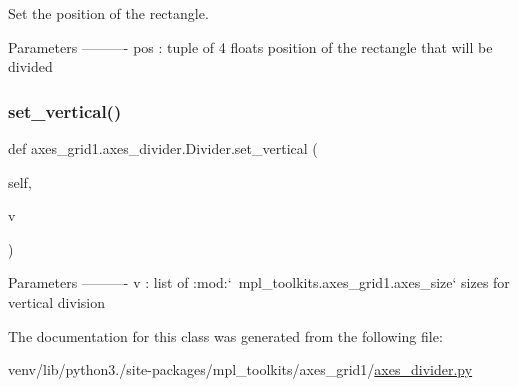 \begin{DoxyVerb}Set the position of the rectangle.

Parameters
----------
pos : tuple of 4 floats
    position of the rectangle that will be divided
\end{DoxyVerb}
 \mbox{\label{classaxes__grid1_1_1axes__divider_1_1Divider_a29de33914fc9161ce56c4b3942f3573f}} 
\subsubsection{\texorpdfstring{set\+\_\+vertical()}{set\_vertical()}}
{\footnotesize\ttfamily def axes\+\_\+grid1.\+axes\+\_\+divider.\+Divider.\+set\+\_\+vertical (\begin{DoxyParamCaption}\item[{}]{self,  }\item[{}]{v }\end{DoxyParamCaption})}

\begin{DoxyVerb}Parameters
----------
v : list of :mod:`~mpl_toolkits.axes_grid1.axes_size`
    sizes for vertical division
\end{DoxyVerb}
 

The documentation for this class was generated from the following file\+:\begin{DoxyCompactItemize}
\item 
venv/lib/python3./site-\/packages/mpl\+\_\+toolkits/axes\+\_\+grid1/\hyperlink{axes__grid1_2axes__divider_8py}{axes\+\_\+divider.\+py}\end{DoxyCompactItemize}
